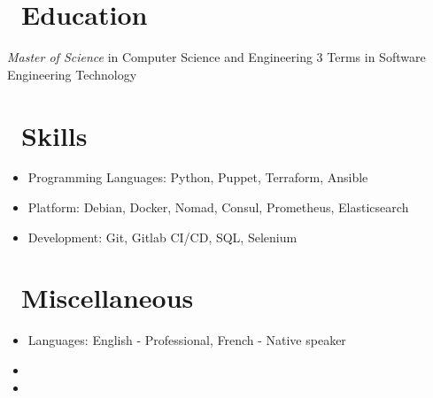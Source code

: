 \documentclass{resume}
\begin{document}
\section{\texorpdfstring{\textbf{}\ Education}{Education}}

\textit{Master of Science} in Computer Science and Engineering
3 Terms in Software Engineering Technology

\section{\texorpdfstring{\textbf{}\ Skills}{Skills}}

\begin{itemize}[parsep=0.5ex]
  \item Programming Languages: Python, Puppet, Terraform, Ansible
  \item Platform: Debian, Docker, Nomad, Consul, Prometheus, Elasticsearch
  \item Development: Git, Gitlab CI/CD, SQL, Selenium
\end{itemize}

\section{\texorpdfstring{\textbf{}\ Miscellaneous}{Miscellaneous}}

\begin{itemize}[parsep=0.5ex]
  \item Languages: English - Professional, French - Native speaker
  \item {}
  \item {}
\end{itemize}
\end{document}
